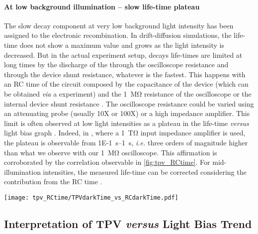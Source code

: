 		\paragraph{At low background illumination -- slow life\hyp{}time plateau}
		The slow decay component at very low background light intensity has been assigned to the electronic recombination.
		In drift-diffusion simulations, the life\hyp{}time does not show a maximum value and grows as the light intensity is decreased.
		But in the actual experiment setup, decays life\hyp{}times are limited at long times by the discharge of the through the oscilloscope resistance and through the device shunt resistance, whatever is the fastest.
		This happens with an RC time of the circuit composed by the capacitance of the device (which can be obtained \textsl{via} a  experiment) and the \SI{1}{\Mohm} resistance of the oscilloscope or the internal device shunt resistance \cite{Tvingstedt2017}.
		The oscilloscope resistance could be varied using an attenuating probe (usually 10X or 100X) or a high impedance amplifier.
		This limit is often observed at low light intensities as a plateau in the  life\hyp{}time \textsl{versus} light bias graph \cite{Tvingstedt2017}.
		Indeed, in , where a \SI{1}{\tera\ohm} input impedance amplifier is used, the plateau is observable from \SIrange{1E-1}{1}{\s}, \textsl{i.e.} three orders of magnitude higher than what we observe with our \SI{1}{\Mohm} oscilloscope.
		This affirmation is corroborated by the correlation observable in \cref{fig:tpv_RCtime}.
		For mid-illumination intensities, the measured life\hyp{}time can be corrected considering the contribution from the RC time \cite{Credgington2014}.

		\begin{SCfigure}
			\centering
			\texttt{[image: tpv\_RCtime/TPVdarkTime\_vs\_RCdarkTime.pdf]}
			\label{fig:tpv_RCtime}
		\end{SCfigure}

	\subsection{Interpretation of TPV \textsl{versus} Light Bias Trend}


